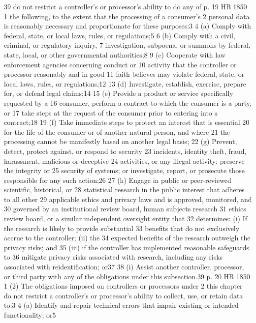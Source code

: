 39 do not restrict a controller's or processor's ability to do any of
p. 19 HB 1850
1 the following, to the extent that the processing of a consumer's
2 personal data is reasonably necessary and proportionate for these
purposes:3
4 (a) Comply with federal, state, or local laws, rules, or
regulations;5
6 (b) Comply with a civil, criminal, or regulatory inquiry,
7 investigation, subpoena, or summons by federal, state, local, or
other governmental authorities;8
9 (c) Cooperate with law enforcement agencies concerning conduct or
10 activity that the controller or processor reasonably and in good
11 faith believes may violate federal, state, or local laws, rules, or
regulations;12
13 (d) Investigate, establish, exercise, prepare for, or defend
legal claims;14
15 (e) Provide a product or service specifically requested by a
16 consumer, perform a contract to which the consumer is a party, or
17 take steps at the request of the consumer prior to entering into a
contract;18
19 (f) Take immediate steps to protect an interest that is essential
20 for the life of the consumer or of another natural person, and where
21 the processing cannot be manifestly based on another legal basis;
22 (g) Prevent, detect, protect against, or respond to security
23 incidents, identity theft, fraud, harassment, malicious or deceptive
24 activities, or any illegal activity; preserve the integrity or
25 security of systems; or investigate, report, or prosecute those
responsible for any such action;26
27 (h) Engage in public or peer-reviewed scientific, historical, or
28 statistical research in the public interest that adheres to all other
29 applicable ethics and privacy laws and is approved, monitored, and
30 governed by an institutional review board, human subjects research
31 ethics review board, or a similar independent oversight entity that
32 determines: (i) If the research is likely to provide substantial
33 benefits that do not exclusively accrue to the controller; (ii) the
34 expected benefits of the research outweigh the privacy risks; and
35 (iii) if the controller has implemented reasonable safeguards to
36 mitigate privacy risks associated with research, including any risks
associated with reidentification; or37
38 (i) Assist another controller, processor, or third party with any
of the obligations under this subsection.39
p. 20 HB 1850
1 (2) The obligations imposed on controllers or processors under
2 this chapter do not restrict a controller's or processor's ability to
collect, use, or retain data to:3
4 (a) Identify and repair technical errors that impair existing or
intended functionality; or5
